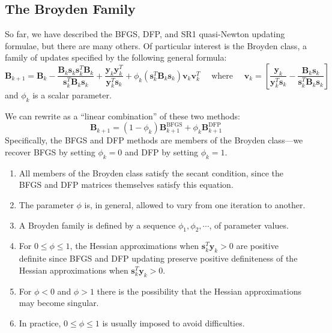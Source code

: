 \documentclass[11pt]{article}
\theoremstyle{plain} %
\newenvironment{topic}
{\color{C2}\normalfont\begin{framed}\begingroup }
  {\endgroup\end{framed}}
\theoremstyle{remark}
\begin{document}
\subsection{The Broyden Family}
\begin{topic}
  So far, we have described the BFGS, DFP, and SR1 quasi-Newton updating formulae,
  but there are many others. Of particular interest is the Broyden class, a family
  of updates specified by the following general formula:
  $$
    \mathbf{B}_{k+1} = \mathbf{B}_k - \frac{\mathbf{B}_k \mathbf{s}_k \mathbf{s}_k^T \mathbf{B}_k}{\mathbf{s}_k^T \mathbf{B}_k \mathbf{s}_k} + \frac{\mathbf{y}_k \mathbf{y}_k^T}{\mathbf{y}_k^T \mathbf{s}_k} + \phi_k\left(\mathbf{s}_k^T \mathbf{B}_k \mathbf{s}_k\right) \mathbf{v}_k \mathbf{v}_k^T
    \quad \text{ where }\quad
    \mathbf{v}_k = \left[\frac{\mathbf{y}_k}{\mathbf{y}_k^T \mathbf{s}_k} - \frac{\mathbf{B}_k \mathbf{s}_k}{\mathbf{s}_k^T \mathbf{B}_k \mathbf{s}_k}\right]
  $$
  and $\phi_k$ is a scalar parameter.

  We can rewrite as a ``linear combination'' of these two methods:
  $$
    \mathbf{B}_{k+1} = \left(1-\phi_k\right) \mathbf{B}_{k+1}^{\mathrm{BFGS}} + \phi_k \mathbf{B}_{k+1}^{\mathrm{DFP}}
  $$
  Specifically, the BFGS and DFP methods are members of the Broyden class—we recover BFGS by
  setting $\phi_k=0$ and DFP by setting $\phi_k=1$.

  \begin{enumerate}
    \item All members of the Broyden class satisfy the
          secant condition, since the BFGS and DFP matrices themselves satisfy this
          equation.
    \item The parameter $\phi$ is, in general, allowed to vary from one iteration to another.
    \item A Broyden family is defined by a sequence $\phi_1, \phi_2, \cdots$, of parameter values.
    \item For $0 \leqslant \phi \leqslant 1$, the Hessian approximations when $\mathbf{s}_k^T \mathbf{y}_k > 0$ are positive definite since
          BFGS and DFP updating preserve positive definiteness of the Hessian approximations when $\mathbf{s}_k^T \mathbf{y}_k > 0$.
    \item For $\phi<0$ and $\phi>1$ there is the possibility that the Hessian approximations may become singular.
    \item In practice, $0 \leqslant \phi \leqslant 1$ is usually imposed to avoid difficulties.
  \end{enumerate}


\end{topic}
\end{document}
